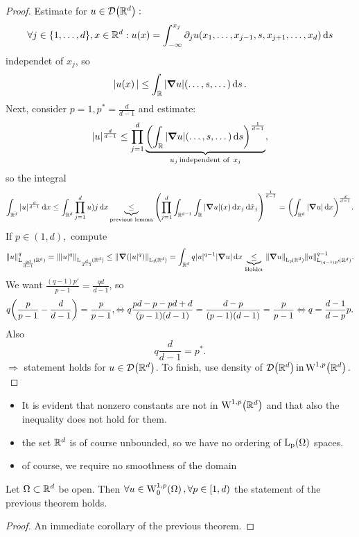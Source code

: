 \documentclass{article}
\begin{document}
\begin{proof}
	   Estimate for $u \in \mathcal{D}\qty({\mathbb R}^d):$
	   \[
		   \forall j \in \{1,\dots,d\}, x \in {\mathbb R}^d: u\qty(x)=\int_{-\infty}^{x_j}\partial_{j}u\qty(x_1,\dots,x_{j-1},s,x_{j+1},\dots,x_d)\dd{s}
	   \]
	   independet of $x_j$, so
	   \[
		   |u\qty(x)| \leq \int_{{\mathbb R}}|\grad u|\qty(\dots,s,\dots)\dd{s}.
	   \]
	   Next, consider $p=1, p^{*}=\frac{d}{d-1}$ and estimate:
	   \[
		   |u|^{\frac{d}{d-1}}\leq\prod_{j=1}^d\underbrace{\qty(\int_{{\mathbb R}}|\grad u| (\dots, s, \dots) \dd{s})^{\frac{1}{d-1}}}_{u_j \, \text{independent of } \,x_j},
	   \]
	   so the integral
	   \[
		   \int_{{\mathbb R}^d}|u|^{\frac{d}{d-1}}\dd{x} \leq \int_{{\mathbb R}^d}\prod_{j=1}^d u)j \dd{x} \underbrace{\leq}_{\text{previous lemma}} \qty(\prod_{j=1}^d \int_{{\mathbb R}^{d-1}}\int_{{\mathbb R}}|\grad u|\qty(x)\dd{x_j}\dd{\hat{x}_j})^{\frac{1}{d-1}} = \qty(\int_{{\mathbb R}^d}|\grad u|\dd{x})^{\frac{d}{d-1}}.
	   \]
	   If $p \in (1,d),$ compute
	   \[
		   \norm{u}_{\LpSet[\frac{qd}{d-1}]{\R^d}}^q = \norm{|u|^q}_{\LpSet[\frac{d}{d-1}]{\R^d}} \leq \norm{\grad (|u|^q)}_{\LpSet[1]{\R^d}} = \int_{\R^d}q|u|^{q-1} |\grad u| \dd{x} \underbrace{\leq}_{\, \text{Holder} \,} \norm{\grad u}_{\LpSet[p]{\R^d}} \norm{u}_{\LpSet[(q-1)p']{\R^d}}^{q-1}.
	   \] We want $\frac{(q-1)p'}{p-1} = \frac{qd}{d-1}$, so
	   \[
		   q \qty(\frac{p}{p-1} - \frac{d}{d-1}) = \frac{p}{p-1}, \Leftrightarrow q\frac{pd-p-pd+d}{(p-1)(d-1)}=\frac{d-p}{\qty(p-1)\qty(d-1)}=\frac{p}{p-1} \Leftrightarrow q=\frac{d-1}{d-p}p.
	   \]
	   Also
	   \[
		   q \frac{d}{d-1}=p^{*}.
	   \]
	   $\Rightarrow$ statement holds for $u \in \mathcal{D}\qty({\mathbb R}^d)$. To finish, use density of $\mathcal{D}\qty(\R^d) \, \text{in} \, \WkpSet[1][p]{\R^d}.$
\end{proof}


\begin{remark}

\begin{itemize}
	\item It is evident that nonzero constants are not in $\WkpSet[1][p]{\R^d}$ and that also the inequality does not hold for them.
	\item the set ${\mathbb R}^d$ is of course unbounded, so we have no ordering of $\LpSet{\Omega}$ spaces.
	\item of course, we require no smoothness of the domain
\end{itemize}


\end{remark}

\begin{theorem}
	Let $\Omega \subset {\mathbb R}^d$ be open. Then $\forall u \in \WkpzeroSet[1][p]{\Omega}, \forall p \in [1,d)$ the statement of the previous theorem holds.
\end{theorem}
\begin{proof}
    An immediate corollary of the previous theorem.
\end{proof}
\end{document}
